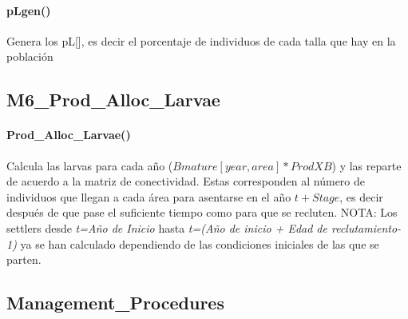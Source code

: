 			\paragraph{pLgen()}
				Genera los pL[], es decir el porcentaje de individuos de cada talla que hay en la población
		\subsection{M6\_Prod\_Alloc\_Larvae}
			\paragraph{Prod\_Alloc\_Larvae()}
				Calcula las larvas para cada año ($Bmature[year, area]* ProdXB$) y las reparte de acuerdo a la matriz de conectividad. Estas corresponden al número de individuos que llegan a cada área para asentarse en el año $t+Stage$, es decir después de que pase el suficiente tiempo como para que se recluten.  
				NOTA: Los settlers desde \emph{t=Año de Inicio} hasta \emph{t=(Año de inicio + Edad de reclutamiento-1)} ya se han calculado dependiendo de las condiciones iniciales de las que se parten. 
		\subsection{Management\_Procedures}
